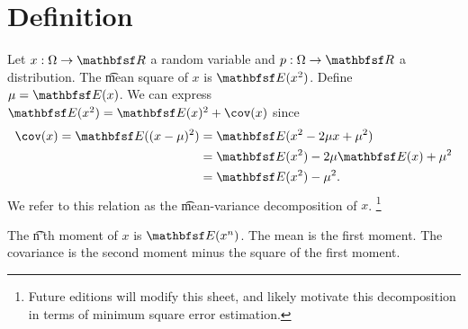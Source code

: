 
\section*{Definition}

Let $x: \Omega  \to \R $ a random variable and $p: \Omega  \to \R $ a distribution.
The \t{mean square} of $x$ is $\E (x^2)$.
Define $\mu  = \E (x)$.
We can express $\E (x^2) = \E (x)^2 + \cov(x)$ since
  \[
\begin{aligned}
\cov(x) = \E ((x -\mu )^2)
&= \E (x^2 - 2\mu x + \mu ^2) \\
&= \E (x^2) -2\mu \E (x) + \mu ^2 \\
&= \E (x^2) - \mu ^2.
\end{aligned}
  \]
We refer to this relation as the \t{mean-variance decomposition} of $x$.
  \ifhmode\unskip\fi\footnote{
Future editions will modify this sheet, and likely motivate this decomposition in terms of minimum square error estimation.
  }

The \t{n'th moment} of $x$ is $\E (x^n)$.
The mean is the first moment.
The covariance is the second moment minus the square of the first moment.

\blankpage
